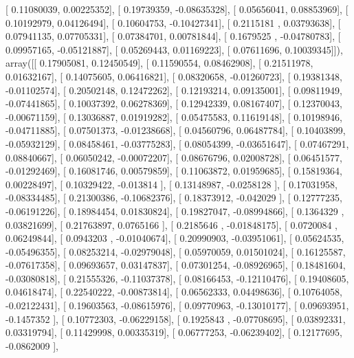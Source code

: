 \documentclass{article}
\begin{document}
       [ 0.11080039,  0.00225352],
       [ 0.19739359, -0.08635328],
       [ 0.05656041,  0.08853969],
       [ 0.10192979,  0.04126494],
       [ 0.10604753, -0.10427341],
       [ 0.2115181 ,  0.03793638],
       [ 0.07941135,  0.07705331],
       [ 0.07384701,  0.00781844],
       [ 0.1679525 , -0.04780783],
       [ 0.09957165, -0.05121887],
       [ 0.05269443,  0.01169223],
       [ 0.07611696,  0.10039345]]), array([[ 0.17905081,  0.12450549],
       [ 0.11590554,  0.08462908],
       [ 0.21511978,  0.01632167],
       [ 0.14075605,  0.06416821],
       [ 0.08320658, -0.01260723],
       [ 0.19381348, -0.01102574],
       [ 0.20502148,  0.12472262],
       [ 0.12193214,  0.09135001],
       [ 0.09811949, -0.07441865],
       [ 0.10037392,  0.06278369],
       [ 0.12942339,  0.08167407],
       [ 0.12370043, -0.00671159],
       [ 0.13036887,  0.01919282],
       [ 0.05475583,  0.11619148],
       [ 0.10198946, -0.04711885],
       [ 0.07501373, -0.01238668],
       [ 0.04560796,  0.06487784],
       [ 0.10403899, -0.05932129],
       [ 0.08458461, -0.03775283],
       [ 0.08054399, -0.03651647],
       [ 0.07467291,  0.08840667],
       [ 0.06050242, -0.00072207],
       [ 0.08676796,  0.02008728],
       [ 0.06451577, -0.01292469],
       [ 0.16081746,  0.00579859],
       [ 0.11063872,  0.01959685],
       [ 0.15819364,  0.00228497],
       [ 0.10329422, -0.013814  ],
       [ 0.13148987, -0.0258128 ],
       [ 0.17031958, -0.08334485],
       [ 0.21300386, -0.10682376],
       [ 0.18373912, -0.042029  ],
       [ 0.12777235, -0.06191226],
       [ 0.18984454,  0.01830824],
       [ 0.19827047, -0.08994866],
       [ 0.1364329 ,  0.03821699],
       [ 0.21763897,  0.0765166 ],
       [ 0.2185646 , -0.01848175],
       [ 0.0720084 ,  0.06249844],
       [ 0.0943203 , -0.01040674],
       [ 0.20990903, -0.03951061],
       [ 0.05624535, -0.05496355],
       [ 0.08253214, -0.02979048],
       [ 0.05970059,  0.01501024],
       [ 0.16125587, -0.07617358],
       [ 0.09693657,  0.03147837],
       [ 0.07301254, -0.08926965],
       [ 0.18481604, -0.03080818],
       [ 0.21555326, -0.11037378],
       [ 0.08166453, -0.12110476],
       [ 0.19408605,  0.04618474],
       [ 0.22540222, -0.00873814],
       [ 0.06562333,  0.04498636],
       [ 0.10764058, -0.02122431],
       [ 0.19603563, -0.08615976],
       [ 0.09770963, -0.13010177],
       [ 0.09693951, -0.1457352 ],
       [ 0.10772303, -0.06229158],
       [ 0.1925843 , -0.07708695],
       [ 0.03892331,  0.03319794],
       [ 0.11429998,  0.00335319],
       [ 0.06777253, -0.06239402],
       [ 0.12177695, -0.0862009 ],
\end{document}
